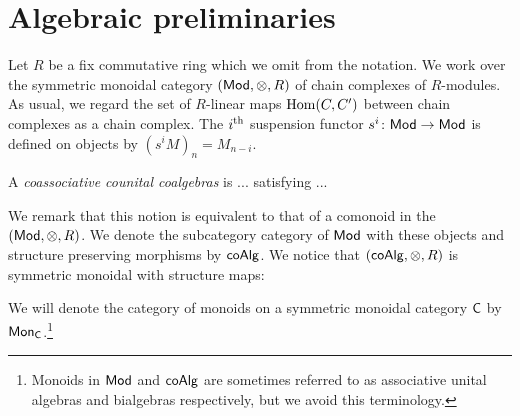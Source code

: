 
\section{Algebraic preliminaries}

Let $R$ be a fix commutative ring which we omit from the notation.
We work over the symmetric monoidal category $(\mathsf{Mod}, \otimes, R)$ of chain complexes of $R$-modules.
As usual, we regard the set of $R$-linear maps $\mathrm{Hom}(C, C^\prime)$ between chain complexes as a chain complex.
The $i^\mathrm{th}$ suspension functor $s^i \colon \mathsf{Mod} \to \mathsf{Mod}$ is defined on objects by $(s^{i}M)_n= M_{n-i}$.

A \textit{coassociative counital coalgebras} is ... satisfying ... 

We remark that this notion is equivalent to that of a comonoid in the $(\mathsf{Mod}, \otimes, R)$.
We denote the subcategory category of $\mathsf{Mod}$ with these objects and structure preserving morphisms by $\mathsf{coAlg}$.
We notice that $(\mathsf{coAlg}, \otimes, R)$ is symmetric monoidal with structure maps:
\begin{center}
 \par
{}
\end{center}

We will denote the category of monoids on a symmetric monoidal category $\mathsf{C}$ by $\mathsf{Mon}_{\mathsf{C}}$.\footnote{Monoids in $\mathsf{Mod}$ and $\mathsf{coAlg}$ are sometimes referred to as associative unital algebras and bialgebras respectively, but we avoid this terminology.}




